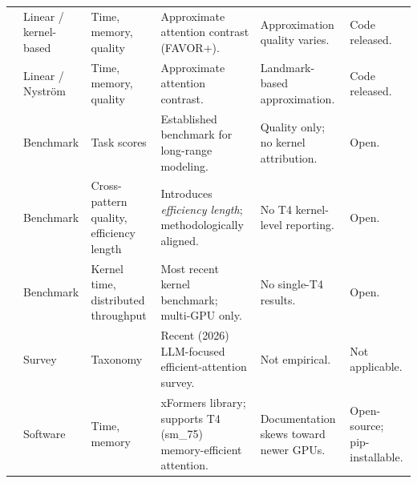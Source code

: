 \documentclass[11pt]{article}
\begin{document}
\begin{small}
\begin{longtable}{p{2.4cm} p{1.6cm} p{1.6cm} p{2.5cm} p{2.2cm} p{2.5cm}}
\cite{choromanski2022rethinkingattentionperformers} & Linear / kernel-based & Time, memory, quality & Approximate attention contrast (FAVOR+). & Approximation quality varies. & Code released. \\
\cite{xiong2021nystromformernystrombasedalgorithmapproximating} & Linear / Nystr{\"o}m & Time, memory, quality & Approximate attention contrast. & Landmark-based approximation. & Code released. \\
\cite{tay2020longrangearenabenchmark} & Benchmark & Task scores & Established benchmark for long-range modeling. & Quality only; no kernel attribution. & Open. \\
\cite{zhang2025cabcomprehensiveattentionbenchmarking} & Benchmark & Cross-pattern quality, efficiency length & Introduces \textit{efficiency length}; methodologically aligned. & No T4 kernel-level reporting. & Open. \\
\cite{bu2025longcontextattentionbenchmark} & Benchmark & Kernel time, distributed throughput & Most recent kernel benchmark; multi-GPU only. & No single-T4 results. & Open. \\
\cite{sun2026efficientattentionmechanismslarge} & Survey & Taxonomy & Recent (2026) LLM-focused efficient-attention survey. & Not empirical. & Not applicable. \\
\cite{xformers2022} & Software & Time, memory & xFormers library; supports T4 (sm\_75) memory-efficient attention. & Documentation skews toward newer GPUs. & Open-source; pip-installable. \\
\end{longtable}
\end{small}

\nocite{*}
\printbibliography[title={References}]
\end{document}
